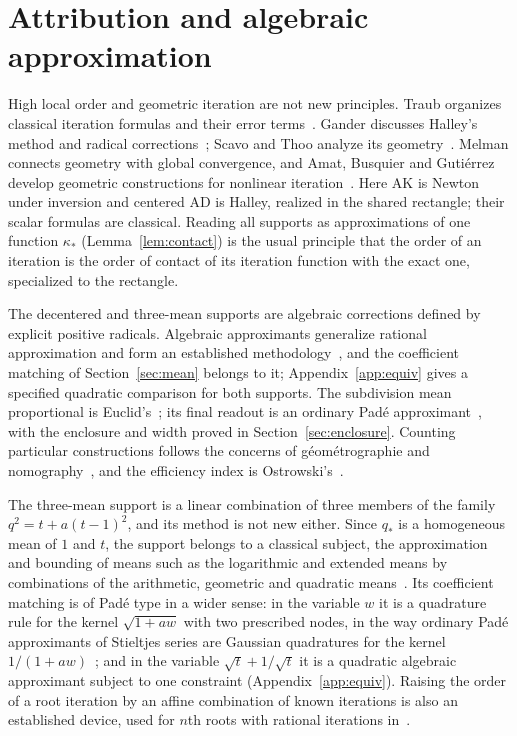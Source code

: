 \section{Attribution and algebraic approximation}\label{sec:attribution}

High local order and geometric iteration are not new principles. Traub organizes classical iteration
formulas and their error terms~\cite{traub61,traub64}. Gander discusses Halley's method and radical
corrections~\cite{gander}; Scavo and Thoo analyze its geometry~\cite{scavo}. Melman connects geometry
with global convergence, and Amat, Busquier and Guti\'errez develop geometric constructions for
nonlinear iteration~\cite{melman,amat}. Here AK is Newton under inversion and centered AD is Halley,
realized in the shared rectangle; their scalar formulas are classical. Reading all supports as
approximations of one function $\kappa_*$ (Lemma~\ref{lem:contact}) is the usual principle that the
order of an iteration is the order of contact of its iteration function with the exact one, specialized
to the rectangle.

The decentered and three-mean supports are algebraic corrections defined by explicit positive
radicals. Algebraic approximants generalize rational approximation and form an established
methodology~\cite{sergeev,shafer}, and the coefficient matching of Section~\ref{sec:mean} belongs to it;
Appendix~\ref{app:equiv} gives a specified quadratic comparison for both supports. The subdivision mean proportional is Euclid's~\cite{euclid}; its final readout is an ordinary
Pad\'e approximant~\cite{dlmf,baker}, with the enclosure and width proved in
Section~\ref{sec:enclosure}. Counting particular constructions follows the concerns of
g\'eom\'etrographie and nomography~\cite{lemoine,ocagne}, and the efficiency index is
Ostrowski's~\cite{ostrowski}.

The three-mean support is a linear combination of three members of the family
$q^{2}=t+a(t-1)^{2}$, and its method is not new either. Since $q_*$ is a homogeneous mean of $1$ and
$t$, the support belongs to a classical subject, the approximation and bounding of means such as the
logarithmic and extended means by combinations of the arithmetic, geometric and quadratic
means~\cite{carlson,stolarsky}. Its coefficient matching is of Pad\'e type in a wider sense: in the
variable $w$ it is a quadrature rule for the kernel $\sqrt{1+aw}$ with two prescribed nodes, in the way
ordinary Pad\'e approximants of Stieltjes series are Gaussian quadratures for the kernel
$1/(1+aw)$~\cite{baker}; and in the variable $\sqrt t+1/\sqrt t$ it is a quadratic algebraic approximant
subject to one constraint (Appendix~\ref{app:equiv}). Raising the order of a root iteration by an affine
combination of known iterations is also an established device, used for $n$th roots with rational
iterations in~\cite{dubeau}.

